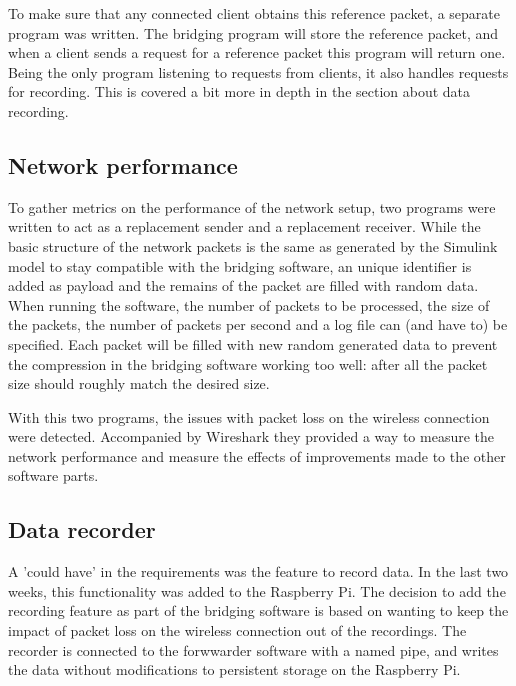 To make sure that any connected client obtains this reference packet, a separate program was written. The bridging program will store the reference packet, and when a client sends a request for a reference packet this program will return one. Being the only program listening to requests from clients, it also handles requests for recording. This is covered a bit more in depth in the section about data recording.

\subsection{Network performance}

To gather metrics on the performance of the network setup, two programs were written to act as a replacement sender and a replacement receiver. While the basic structure of the network packets is the same as generated by the Simulink model to stay compatible with the bridging software, an unique identifier is added as payload and the remains of the packet are filled with random data. When running the software, the number of packets to be processed, the size of the packets, the number of packets per second and a log file can (and have to) be specified. Each packet will be filled with new random generated data to prevent the compression in the bridging software working too well: after all the packet size should roughly match the desired size.

With this two programs, the issues with packet loss on the wireless connection were detected. Accompanied by Wireshark they provided a way to measure the network performance and measure the effects of improvements made to the other software parts.


\subsection{Data recorder}

A 'could have' in the requirements was the feature to record data. In the last two weeks, this functionality was added to the Raspberry Pi. The decision to add the recording feature as part of the bridging software is based on wanting to keep the impact of packet loss on the wireless connection out of the recordings. The recorder is connected to the forwwarder software with a named pipe, and writes the data without modifications to persistent storage on the Raspberry Pi.

